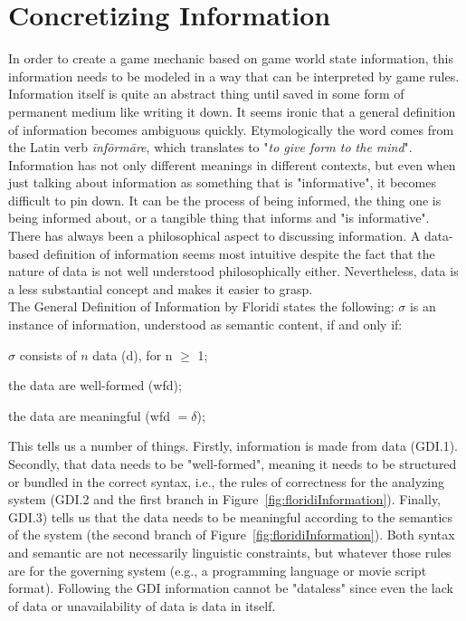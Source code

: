 \section{Concretizing Information}
\label{section:info}
In order to create a game mechanic based on game world state information, this information needs to be modeled in a way that can be interpreted by game rules. Information itself is quite an abstract thing until saved in some form of permanent medium like writing it down. It seems ironic that a general definition of information becomes ambiguous quickly. Etymologically the word comes from the Latin verb \textit{\={i}nf\={o}rm\={a}re}, which translates to "\textit{to give form to the mind}". Information has not only different meanings in different contexts, but even when just talking about information as something that is "informative", it becomes difficult to pin down. It can be the process of being informed, the thing one is being informed about, or a tangible thing that informs and "is informative".~\cite{Buckland1991}\\
There has always been a philosophical aspect to discussing information. A data-based definition of information seems most intuitive despite the fact that the nature of data is not well understood philosophically either. Nevertheless, data is a less substantial concept and makes it easier to grasp.\\
The General Definition of Information by Floridi states the following:
\vspace*{0.5cm}
 $\sigma$ is an instance of information, understood as semantic content, if and only if:\par
{} $\sigma$ consists of $n$ data (d), for n $\geq$ 1;\par
{} the data are well-formed (wfd);\par
{} the data are meaningful (wfd $= \delta$);\par
\vspace*{0.5cm}
This tells us a number of things. Firstly, information is made from data (GDI.1). Secondly, that data needs to be "well-formed", meaning it needs to be structured or bundled in the correct syntax, i.e., the rules of correctness for the analyzing system (GDI.2 and the first branch in Figure~\ref{fig:floridiInformation}). Finally, GDI.3) tells us that the data needs to be meaningful according to the semantics of the system (the second branch of Figure~\ref{fig:floridiInformation}). Both syntax and semantic are not necessarily linguistic constraints, but whatever those rules are for the governing system (e.g., a programming language or movie script format). Following the GDI information cannot be "dataless" since even the lack of data or unavailability of data is data in itself.~\cite{Floridi2010}\\
